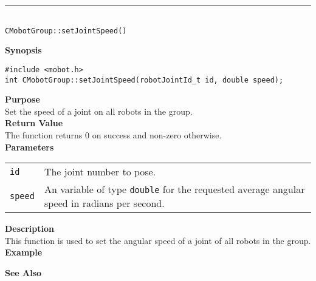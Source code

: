 \noindent
\vspace{5pt}
\rule{4.5in}{0.015in}\\
\noindent
{\LARGE \texttt{CMobotGroup::setJointSpeed()}}\\
{}

\noindent
{\bf Synopsis}\\
\begin{verbatim}
#include <mobot.h>
int CMobotGroup::setJointSpeed(robotJointId_t id, double speed);
\end{verbatim}

\noindent
{\bf Purpose}\\
Set the speed of a joint on all robots in the group.\\

\noindent
{\bf Return Value}\\
The function returns 0 on success and non-zero otherwise.\\

\noindent
{\bf Parameters}
\vspace{-0.1in}
\begin{description}
\item               
\begin{tabular}{p{10 mm}p{145 mm}}
\texttt{id} & The joint number to pose. \\
\texttt{speed} & An variable of type \texttt{double} for the requested average
angular speed in radians per second.
\end{tabular}
\end{description}

\noindent
{\bf Description}\\
This function is used to set the angular speed of a joint of all robots in the group. 
\noindent\\
{\bf Example}\\
\noindent

\noindent
{\bf See Also}\\


